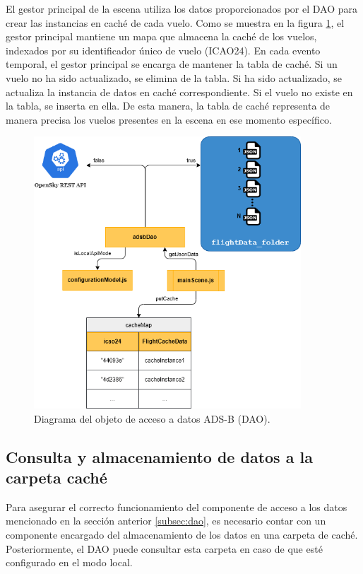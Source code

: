\documentclass[a4paper, 11pt]{book}
\begin{document}
El gestor principal de la escena utiliza los datos proporcionados por el DAO para crear las instancias en caché de cada vuelo. Como se muestra en la figura \ref{fig:dao}, el gestor principal mantiene un mapa que almacena la caché de los vuelos, indexados por su identificador único de vuelo (ICAO24). En cada evento temporal, el gestor principal se encarga de mantener la tabla de caché. Si un vuelo no ha sido actualizado, se elimina de la tabla. Si ha sido actualizado, se actualiza la instancia de datos en caché correspondiente. Si el vuelo no existe en la tabla, se inserta en ella. De esta manera, la tabla de caché representa de manera precisa los vuelos presentes en la escena en ese momento específico.

\begin{figure}[h]
  \centering
  \includegraphics[width=10cm, keepaspectratio]{img/adsbDao.png}
  \caption{Diagrama del objeto de acceso a datos ADS-B (DAO).}
  \label{fig:dao}
\end{figure}

\subsection{Consulta y almacenamiento de datos a la carpeta caché}
\label{subsec:obtencionCache}
Para asegurar el correcto funcionamiento del componente de acceso a los datos mencionado en la sección anterior \ref{subsec:dao}, es necesario contar con un componente encargado del almacenamiento de los datos en una carpeta de caché. Posteriormente, el DAO puede consultar esta carpeta en caso de que esté configurado en el modo local.
\end{document}

